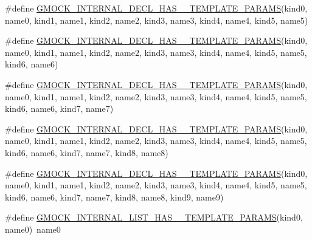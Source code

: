 \begin{DoxyCompactItemize}
\item 
\#define \mbox{\hyperlink{_obj__test_2lib_2googletest-release-1_88_81_2googlemock_2include_2gmock_2gmock-generated-actions_8h_a4c90362350df0faa6e866642f44708fe}{G\+M\+O\+C\+K\+\_\+\+I\+N\+T\+E\+R\+N\+A\+L\+\_\+\+D\+E\+C\+L\+\_\+\+H\+A\+S\+\_\+\_\+\+T\+E\+M\+P\+L\+A\+T\+E\+\_\+\+P\+A\+R\+A\+MS}}(kind0,  name0,  kind1,  name1,  kind2,  name2,  kind3,  name3,  kind4,  name4,  kind5,  name5)
\item 
\#define \mbox{\hyperlink{_obj__test_2lib_2googletest-release-1_88_81_2googlemock_2include_2gmock_2gmock-generated-actions_8h_aaafa5e8b1a116aa8e7f88653415e60cd}{G\+M\+O\+C\+K\+\_\+\+I\+N\+T\+E\+R\+N\+A\+L\+\_\+\+D\+E\+C\+L\+\_\+\+H\+A\+S\+\_\+\_\+\+T\+E\+M\+P\+L\+A\+T\+E\+\_\+\+P\+A\+R\+A\+MS}}(kind0,  name0,  kind1,  name1,  kind2,  name2,  kind3,  name3,  kind4,  name4,  kind5,  name5,  kind6,  name6)
\item 
\#define \mbox{\hyperlink{_obj__test_2lib_2googletest-release-1_88_81_2googlemock_2include_2gmock_2gmock-generated-actions_8h_a8d8ec2523daa6fc6c5b8f6a45898e0b1}{G\+M\+O\+C\+K\+\_\+\+I\+N\+T\+E\+R\+N\+A\+L\+\_\+\+D\+E\+C\+L\+\_\+\+H\+A\+S\+\_\+\_\+\+T\+E\+M\+P\+L\+A\+T\+E\+\_\+\+P\+A\+R\+A\+MS}}(kind0,  name0,  kind1,  name1,  kind2,  name2,  kind3,  name3,  kind4,  name4,  kind5,  name5,  kind6,  name6,  kind7,  name7)
\item 
\#define \mbox{\hyperlink{_obj__test_2lib_2googletest-release-1_88_81_2googlemock_2include_2gmock_2gmock-generated-actions_8h_ae6dd478ff5757fa4e66ef2dcf6e22325}{G\+M\+O\+C\+K\+\_\+\+I\+N\+T\+E\+R\+N\+A\+L\+\_\+\+D\+E\+C\+L\+\_\+\+H\+A\+S\+\_\+\_\+\+T\+E\+M\+P\+L\+A\+T\+E\+\_\+\+P\+A\+R\+A\+MS}}(kind0,  name0,  kind1,  name1,  kind2,  name2,  kind3,  name3,  kind4,  name4,  kind5,  name5,  kind6,  name6,  kind7,  name7,  kind8,  name8)
\item 
\#define \mbox{\hyperlink{_obj__test_2lib_2googletest-release-1_88_81_2googlemock_2include_2gmock_2gmock-generated-actions_8h_aa3db5758c68ca3a45a795d91fea7bb42}{G\+M\+O\+C\+K\+\_\+\+I\+N\+T\+E\+R\+N\+A\+L\+\_\+\+D\+E\+C\+L\+\_\+\+H\+A\+S\+\_\+\_\+\+T\+E\+M\+P\+L\+A\+T\+E\+\_\+\+P\+A\+R\+A\+MS}}(kind0,  name0,  kind1,  name1,  kind2,  name2,  kind3,  name3,  kind4,  name4,  kind5,  name5,  kind6,  name6,  kind7,  name7,  kind8,  name8,  kind9,  name9)
\item 
\#define \mbox{\hyperlink{_obj__test_2lib_2googletest-release-1_88_81_2googlemock_2include_2gmock_2gmock-generated-actions_8h_a900f637cda387230021133903f5e078b}{G\+M\+O\+C\+K\+\_\+\+I\+N\+T\+E\+R\+N\+A\+L\+\_\+\+L\+I\+S\+T\+\_\+\+H\+A\+S\+\_\+\_\+\+T\+E\+M\+P\+L\+A\+T\+E\+\_\+\+P\+A\+R\+A\+MS}}(kind0,  name0)~name0

\end{DoxyCompactItemize}
